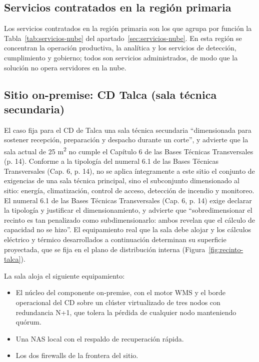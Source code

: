 \subsection{Servicios contratados en la región primaria}

Los servicios contratados en la región primaria son los que agrupa por función la Tabla~\ref{tab:servicios-nube} del apartado~\ref{sec:servicios-nube}. En esta región se concentran la operación productiva, la analítica y los servicios de detección, cumplimiento y gobierno; todos son servicios administrados, de modo que la solución no opera servidores en la nube.

\subsection{Sitio on-premise: CD Talca (sala técnica secundaria)}

El caso fija para el CD de Talca una sala técnica secundaria ``dimensionada para sostener recepción, preparación y despacho durante un corte'', y advierte que la sala actual de 25 m\textsuperscript{2} no cumple el Capítulo 6 de las Bases Técnicas Transversales (p. 14). Conforme a la tipología del numeral 6.1 de las Bases Técnicas Transversales (Cap. 6, p. 14), no se aplica íntegramente a este sitio el conjunto de exigencias de una sala técnica principal, sino el subconjunto dimensionado al sitio: energía, climatización, control de acceso, detección de incendio y monitoreo. El numeral 6.1 de las Bases Técnicas Transversales (Cap. 6, p. 14) exige declarar la tipología y justificar el dimensionamiento, y advierte que ``sobredimensionar el recinto es tan penalizado como subdimensionarlo: ambos revelan que el cálculo de capacidad no se hizo''. El equipamiento real que la sala debe alojar y los cálculos eléctrico y térmico desarrollados a continuación determinan su superficie proyectada, que se fija en el plano de distribución interna (Figura~\ref{fig:recinto-talca}).

La sala aloja el siguiente equipamiento:

\begin{itemize}
  \item El núcleo del componente on-premise, con el motor WMS y el borde operacional del CD sobre un clúster virtualizado de tres nodos con redundancia N+1, que tolera la pérdida de cualquier nodo manteniendo quórum.
  \item Una NAS local con el respaldo de recuperación rápida.
  \item Los dos firewalls de la frontera del sitio.
\end{itemize}

